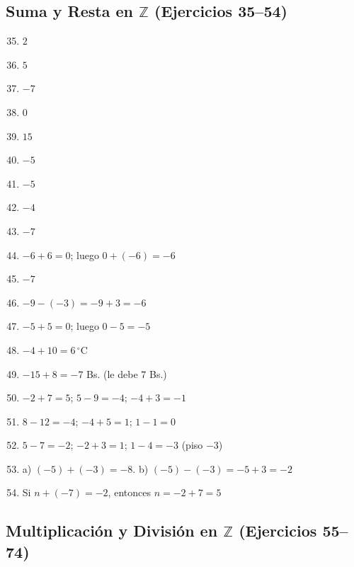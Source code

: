 \documentclass[12pt, letterpaper]{article}
\newcommand{\Z}{\mathbb{Z}}
\begin{document}
\subsection*{Suma y Resta en $\Z$ (Ejercicios 35--54)}

\begin{enumerate}[leftmargin=*, label=\textbf{\arabic*.}]
  \setcounter{enumi}{34}
  \item $2$
  \item $5$
  \item $-7$
  \item $0$
  \item $15$
  \item $-5$
  \item $-5$
  \item $-4$
  \item $-7$
  \item $-6 + 6 = 0$; luego $0 + (-6) = -6$
  \item $-7$
  \item $-9 - (-3) = -9 + 3 = -6$
  \item $-5 + 5 = 0$; luego $0 - 5 = -5$
  \item $-4 + 10 = 6\,^{\circ}$C
  \item $-15 + 8 = -7$ Bs. (le debe $7$ Bs.)
  \item $-2 + 7 = 5$; $5 - 9 = -4$; $-4 + 3 = -1$
  \item $8 - 12 = -4$; $-4 + 5 = 1$; $1 - 1 = 0$
  \item $5 - 7 = -2$; $-2 + 3 = 1$; $1 - 4 = -3$ (piso $-3$)
  \item a) $(-5) + (-3) = -8$. \quad b) $(-5) - (-3) = -5 + 3 = -2$
  \item Si $n + (-7) = -2$, entonces $n = -2 + 7 = 5$
\end{enumerate}

\subsection*{Multiplicación y División en $\Z$ (Ejercicios 55--74)}
\end{document}
